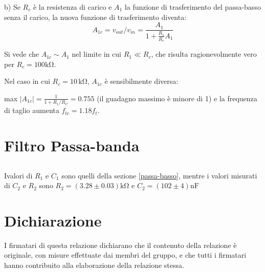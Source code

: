 \documentclass[10pt,a4paper]{article}
\begin{document}
b)  Se $R_c$ è la resistenza di carico e $A_1$ la funzione di trasferimento del passa-basso senza il carico,  la nuova funzione di trasferimento diventa:
\[ A_{1c} = v_{out}/v_{in}= \frac{A_1}{1+\frac{R_1}{R_c}A_1}\]

Si vede che $A_{1c} \sim A_{1}$ nel limite in cui $R_1 \ll R_c$, che risulta ragionevolmente vero per $R_c = 100 \si{\kilo\ohm}$.

Nel caso in cui $R_c = 10 \, \si{\kilo\ohm}$, $A_{1c}$ è sensibilmente diversa: 

max $|A_{1c}|= \frac{1}{1+R_1/R_C}=0.755$ (il guadagno massimo è minore di 1) e la frequenza di taglio  aumenta $f_{tc}= 1.18 f_{t}$.

\section{Filtro Passa-banda}
\subsection{}
Ivalori di $R_1$ e $C_1$ sono quelli della sezione \ref{passa-basso}, mentre i valori misurati di $C_2$ e $R_2$ sono $R_2  = (3.28 \pm 0.03 )\si{\kilo\ohm}$ e  $C_2  = (102\pm 4 )\si{\nano\farad}$

\section*{Dichiarazione}
I firmatari di questa relazione dichiarano che il contenuto della relazione \`e originale, con misure effettuate dai membri del gruppo, e che tutti i firmatari hanno contribuito alla elaborazione della relazione stessa.
\end{document}
